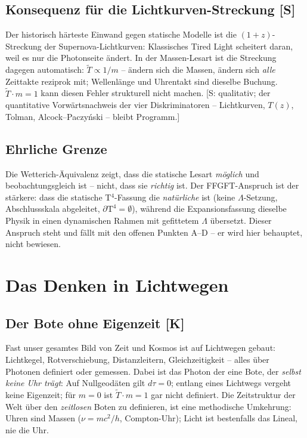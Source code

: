 \documentclass[11pt]{report}
\begin{document}
\section{Konsequenz für die Lichtkurven-Streckung [S]}

Der historisch härteste Einwand gegen statische Modelle ist die
$(1+z)$-Streckung der Supernova-Lichtkurven: Klassisches
Tired Light scheitert daran, weil es nur die Photonseite ändert.
In der Massen-Lesart ist die Streckung dagegen automatisch:
$\tilde T \propto 1/m$ -- ändern sich die Massen, ändern sich
\emph{alle} Zeittakte reziprok mit; Wellenlänge und Uhrentakt sind
dieselbe Buchung. $\tilde T \cdot m = 1$ kann diesen Fehler
strukturell nicht machen. [S: qualitativ; der quantitative
Vorwärtsnachweis der vier Diskriminatoren -- Lichtkurven, $T(z)$,
Tolman, Alcock--Paczyński -- bleibt Programm.]

\section{Ehrliche Grenze}

Die Wetterich-Äquivalenz zeigt, dass die statische Lesart
\emph{möglich} und beobachtungsgleich ist -- nicht, dass sie
\emph{richtig} ist. Der FFGFT-Anspruch ist der stärkere: dass die
statische T$^4$-Fassung die \emph{natürliche} ist (keine
$\Lambda$-Setzung, Abschlussskala abgeleitet,
$\partial\text{T}^4 = \emptyset$), während die Expansionsfassung
dieselbe Physik in einen dynamischen Rahmen mit gefittetem
$\Lambda$ übersetzt. Dieser Anspruch steht und fällt mit den
offenen Punkten A--D -- er wird hier behauptet, nicht bewiesen.

\chapter{Das Denken in Lichtwegen}

\section{Der Bote ohne Eigenzeit [K]}

Fast unser gesamtes Bild von Zeit und Kosmos ist auf Lichtwegen
gebaut: Lichtkegel, Rotverschiebung, Distanzleitern,
Gleichzeitigkeit -- alles über Photonen definiert oder gemessen.
Dabei ist das Photon der eine Bote, der \emph{selbst keine Uhr
trägt}: Auf Nullgeodäten gilt $d\tau = 0$; entlang eines Lichtwegs
vergeht keine Eigenzeit; für $m = 0$ ist $\tilde T \cdot m = 1$
gar nicht definiert. Die Zeitstruktur der Welt über den
\emph{zeitlosen} Boten zu definieren, ist eine methodische
Umkehrung: Uhren sind Massen ($\nu = mc^2/h$, Compton-Uhr); Licht
ist bestenfalls das Lineal, nie die Uhr.
\end{document}
